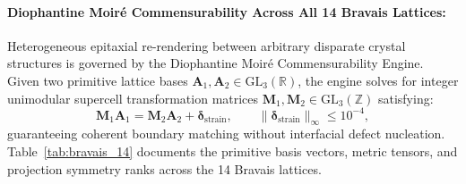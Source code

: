 \documentclass[11pt,onecolumn]{article}
\begin{document}
\paragraph{Diophantine Moir\'e Commensurability Across All 14 Bravais Lattices:}
Heterogeneous epitaxial re-rendering between arbitrary disparate crystal structures is governed by the Diophantine Moir\'e Commensurability Engine. Given two primitive lattice bases $\mathbf{A}_1, \mathbf{A}_2 \in \mathrm{GL}_3(\mathbb{R})$, the engine solves for integer unimodular supercell transformation matrices $\mathbf{M}_1, \mathbf{M}_2 \in \mathrm{GL}_3(\mathbb{Z})$ satisfying:
\begin{equation}
\mathbf{M}_1 \mathbf{A}_1 = \mathbf{M}_2 \mathbf{A}_2 + \boldsymbol{\delta}_{\text{strain}}, \qquad \|\boldsymbol{\delta}_{\text{strain}}\|_\infty \le 10^{-4},
\label{eq:diophantine_moire_deriv}
\end{equation}
guaranteeing coherent boundary matching without interfacial defect nucleation. Table~\ref{tab:bravais_14} documents the primitive basis vectors, metric tensors, and projection symmetry ranks across the 14 Bravais lattices.
\end{document}
